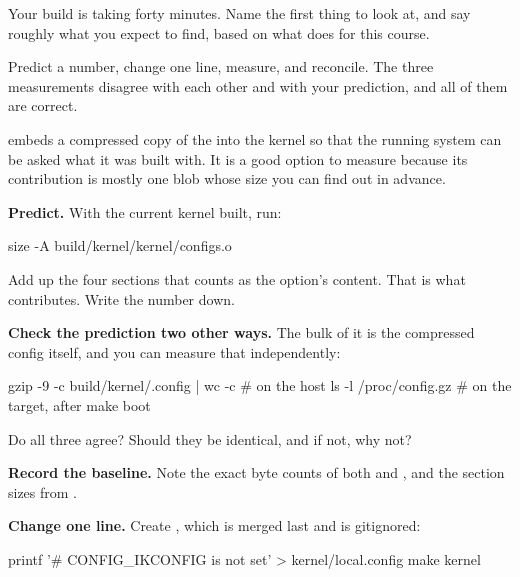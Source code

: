  Your build is taking forty minutes. Name the first thing to look at, and say roughly what
you expect to find, based on what  does for this course.

\label{c3:ex:9}

Predict a number, change one line, measure, and reconcile. The three measurements disagree with each
other and with your prediction, and all of them are correct.

 embeds a compressed copy of the  into the kernel so that the
running system can be asked what it was built with. It is a good option to measure because its
contribution is mostly one blob whose size you can find out in advance.

 \textbf{Predict.} With the current kernel built, run:

\begin{shell}
size -A build/kernel/kernel/configs.o
\end{shell}

\noindent Add up the four sections that  counts as the option's content. That is
what  contributes. Write the number down.

 \textbf{Check the prediction two other ways.} The bulk of it is the compressed config
itself, and you can measure that independently:

\begin{shell}
gzip -9 -c build/kernel/.config | wc -c        # on the host
ls -l /proc/config.gz                           # on the target, after make boot
\end{shell}

\noindent Do all three agree? Should they be identical, and if not, why not?

 \textbf{Record the baseline.} Note the exact byte counts of both
 and , and the section sizes
from .

 \textbf{Change one line.} Create , which is merged last and is
gitignored:

\begin{shell}
printf '# CONFIG_IKCONFIG is not set\n' > kernel/local.config
make kernel
\end{shell}

